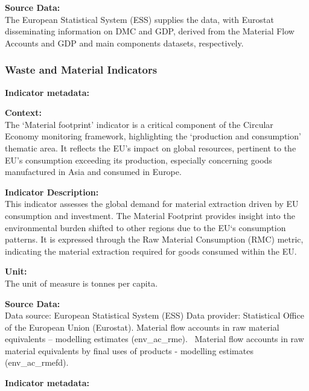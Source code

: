 {\large\textbf{Source Data:}}  \\ \indent
The European Statistical System (ESS) supplies the data, with Eurostat disseminating information on DMC and GDP, derived from the Material Flow Accounts and GDP and main components datasets, respectively.

\subsubsection{Waste and Material Indicators}

\textbf{Indicator metadata:}   \href{https://ec.europa.eu/eurostat/cache/metadata/en/cei_pc020_esmsip2.htm}{\faExternalLink}

{\large\textbf{Context:}}  \\ \indent
The `Material footprint' indicator is a critical component of the Circular Economy monitoring framework, highlighting the `production and consumption' thematic area. It reflects the EU's impact on global resources, pertinent to the EU's consumption exceeding its production, especially concerning goods manufactured in Asia and consumed in Europe.

{\large\textbf{Indicator Description:}}  \\ \indent
This indicator assesses the global demand for material extraction driven by EU consumption and investment. The Material Footprint provides insight into the environmental burden shifted to other regions due to the EU`s consumption patterns. It is expressed through the Raw Material Consumption (RMC) metric, indicating the material extraction required for goods consumed within the EU.

{\large\textbf{Unit:}}  \\ \indent
The unit of measure is tonnes per capita.

{\large\textbf{Source Data:}}  \\ \indent
Data source: European Statistical System (ESS)
Data provider: Statistical Office of the European Union (Eurostat).
Material flow accounts in raw material equivalents -- modelling estimates (env\_ac\_rme).~\href{https://ec.europa.eu/eurostat/web/products-datasets/-/env_ac_rmefd}{\faExternalLink}
Material flow accounts in raw material equivalents by final uses of products - modelling estimates (env\_ac\_rmefd).~\href{https://ec.europa.eu/eurostat/web/products-datasets/-/env_ac_rmefd}{\faExternalLink}

\textbf{Indicator metadata:}   \href{https://ec.europa.eu/eurostat/cache/metadata/en/cei_pc031_esmsip2.htm}{\faExternalLink}

